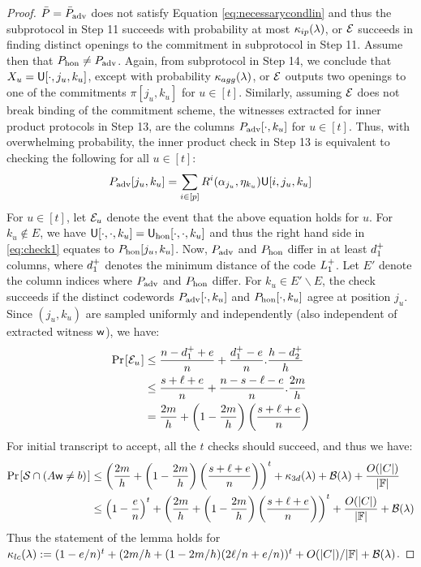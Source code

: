 \begin{proof}
$\bar{P}=\bar{P}_{\rm adv}$ does not satisfy Equation
\eqref{eq:necessarycondlin} and thus the subprotocol in Step 11 succeeds with
probability at most $\kappa_{ip}(\lambda)$, or $\mathcal{E}$ succeeds in finding
distinct openings to the commitment in subprotocol in Step 11. Assume then that $P_{\rm hon}\neq
P_{\rm adv}$. Again, from subprotocol in Step 14, we conclude that $X_u =
\mathsf{U}[\cdot,j_u,k_u]$, except with probability $\kappa_{agg}(\lambda)$, or
$\mathcal{E}$ outputs two openings to one of the commitments $\pi[j_u,k_u]$ for $u\in
[t]$. Similarly, assuming $\mathcal{E}$ does not break binding of the commitment
scheme, the witnesses extracted for inner product protocols in Step 13, are the
columns $P_{\rm adv}[\cdot,k_u]$ for $u\in [t]$. Thus, with overwhelming probability, the inner product check in Step 13 is
equivalent to checking the following for all $u\in [t]$:
\begin{equation}\label{eq:check1}
P_{\rm adv}[j_u,k_u]=\sum_{i\in
[p]}R^i(\alpha_{j_u},\eta_{k_u})\mathsf{U}[i,j_u,k_u]
\end{equation}
For $u\in [t]$, let $\mathcal{E}_u$ denote the event that the above equation holds
for $u$. For $k_u\not\in E$, we have $\mathsf{U}[\cdot,\cdot,k_u]=\mathsf{U}_{\rm
hon}[\cdot,\cdot,k_u]$ and thus the right hand side in \eqref{eq:check1} equates
to $P_{\rm hon}[j_u,k_u]$. Now, $P_{\rm adv}$ and $P_{\rm hon}$ differ in at
least $d^{+}_1$ columns, where $d^{+}_1$ denotes the minimum distance of the
code $L^{+}_1$. Let $E'$ denote the column indices where $P_{\rm adv}$ and
$P_{\rm hon}$ differ. For $k_u\in E'\backslash E$, the check succeeds if the
distinct codewords $P_{\rm adv}[\cdot,k_u]$ and $P_{\rm hon}[\cdot,k_u]$ agree
at position $j_u$. Since $(j_u,k_u)$ are sampled uniformly and independently
(also independent of extracted witness $\mathsf{w}$), we have:
{\small
\begin{align}\label{eq:probeq6}
\prob{\mc{E}_u} &\leq \frac{n-\dashD_1+e}{n} +
\frac{\dashD_1-e}{n}.\frac{h-\dashD_2}{h}
\nonumber \\
	&\leq \frac{s+\ell+e}{n} + \frac{n-s-\ell-e}{n}.\frac{2m}{h} \nonumber \\
	& = \frac{2m}{h} +
\left(1-\frac{2m}{h}\right)\left(\frac{s+\ell+e}{n}\right)
\end{align}
}
For initial transcript to accept, all the $t$ checks should succeed, and thus we
have:
{\small
\begin{align}\label{eq:probeq7}
\prob{\mc{S}\cap (A\wit\neq b)}&\leq
\left(\frac{2m}{h}+\left(1-\frac{2m}{h}\right)\left(\frac{s+\ell+e}{n}\right)\right)^t
+ \kappa_{3d}(\secpar) + \mc{B}(\secpar) +
\frac{O(|C|)}{|\FF|} \nonumber \\
&\leq \left(1-\frac{e}{n}\right)^t +
\left(\frac{2m}{h}+\left(1-\frac{2m}{h}\right)\left(\frac{s+\ell+e}{n}\right)\right)^t
+ \frac{O(|C|)}{|\FF|} + \mc{B}(\secpar)
\end{align}
}
Thus the statement of the lemma holds for $\kappa_{lc}(\lambda) := (1-e/n)^t +
(2m/h + (1-2m/h)(2\ell/n + e/n))^t+O(|C|)/|\mathbb{F}|+\mathcal{B}(\lambda)$.
\end{proof}

